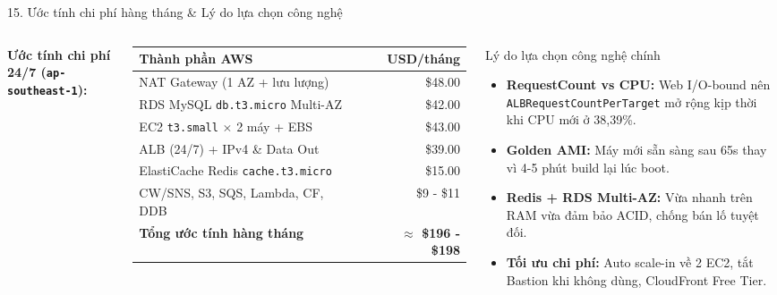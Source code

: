 \documentclass[aspectratio=169,11pt]{beamer}
\begin{document}
\begin{frame}{15. Ước tính chi phí hàng tháng \& Lý do lựa chọn công nghệ}
  \begin{columns}[T]
    \textbf{\small Ước tính chi phí 24/7 (\texttt{ap-southeast-1}):}
    \vspace{5pt}
    {\scriptsize
    \renewcommand{\arraystretch}{1.22}
    \begin{tabular}{@{} >{\raggedright\arraybackslash}p{4.3cm} r @{}}
      \toprule
      \textbf{Thành phần AWS} & \textbf{USD/tháng} \\
      \midrule
      NAT Gateway (1 AZ + lưu lượng) & \$48.00 \\
      RDS MySQL \texttt{db.t3.micro} Multi-AZ & \$42.00 \\
      EC2 \texttt{t3.small} $\times$ 2 máy + EBS & \$43.00 \\
      ALB (24/7) + IPv4 \& Data Out & \$39.00 \\
      ElastiCache Redis \texttt{cache.t3.micro} & \$15.00 \\
      CW/SNS, S3, SQS, Lambda, CF, DDB & \$9 - \$11 \\
      \midrule
      \textbf{Tổng ước tính hàng tháng} & \textbf{$\approx$ \$196 - \$198} \\
      \bottomrule
    \end{tabular}
    }

    \begin{block}{Lý do lựa chọn công nghệ chính}
      \footnotesize
      \begin{itemize}
        \setlength{\itemsep}{3pt}
        \item \textbf{RequestCount vs CPU:} Web I/O-bound nên \texttt{ALBRequestCountPerTarget} mở rộng kịp thời khi CPU mới ở 38,39\%.
        \item \textbf{Golden AMI:} Máy mới sẵn sàng sau 65s thay vì 4-5 phút build lại lúc boot.
        \item \textbf{Redis + RDS Multi-AZ:} Vừa nhanh trên RAM vừa đảm bảo ACID, chống bán lố tuyệt đối.
        \item \textbf{Tối ưu chi phí:} Auto scale-in về 2 EC2, tắt Bastion khi không dùng, CloudFront Free Tier.
      \end{itemize}
    \end{block}
  \end{columns}
\end{frame}
\end{document}

